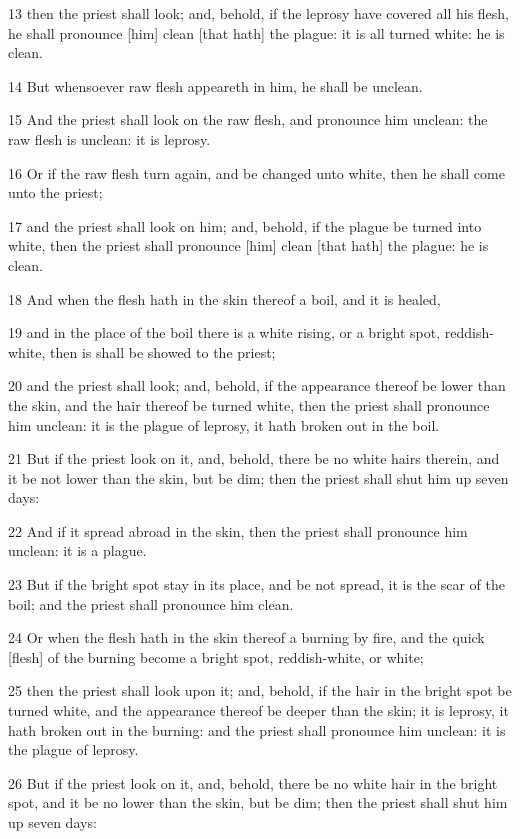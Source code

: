 \par 13 then the priest shall look; and, behold, if the leprosy have covered all his flesh, he shall pronounce [him] clean [that hath] the plague: it is all turned white: he is clean.
\par 14 But whensoever raw flesh appeareth in him, he shall be unclean.
\par 15 And the priest shall look on the raw flesh, and pronounce him unclean: the raw flesh is unclean: it is leprosy.
\par 16 Or if the raw flesh turn again, and be changed unto white, then he shall come unto the priest;
\par 17 and the priest shall look on him; and, behold, if the plague be turned into white, then the priest shall pronounce [him] clean [that hath] the plague: he is clean.
\par 18 And when the flesh hath in the skin thereof a boil, and it is healed,
\par 19 and in the place of the boil there is a white rising, or a bright spot, reddish-white, then is shall be showed to the priest;
\par 20 and the priest shall look; and, behold, if the appearance thereof be lower than the skin, and the hair thereof be turned white, then the priest shall pronounce him unclean: it is the plague of leprosy, it hath broken out in the boil.
\par 21 But if the priest look on it, and, behold, there be no white hairs therein, and it be not lower than the skin, but be dim; then the priest shall shut him up seven days:
\par 22 And if it spread abroad in the skin, then the priest shall pronounce him unclean: it is a plague.
\par 23 But if the bright spot stay in its place, and be not spread, it is the scar of the boil; and the priest shall pronounce him clean.
\par 24 Or when the flesh hath in the skin thereof a burning by fire, and the quick [flesh] of the burning become a bright spot, reddish-white, or white;
\par 25 then the priest shall look upon it; and, behold, if the hair in the bright spot be turned white, and the appearance thereof be deeper than the skin; it is leprosy, it hath broken out in the burning: and the priest shall pronounce him unclean: it is the plague of leprosy.
\par 26 But if the priest look on it, and, behold, there be no white hair in the bright spot, and it be no lower than the skin, but be dim; then the priest shall shut him up seven days:
